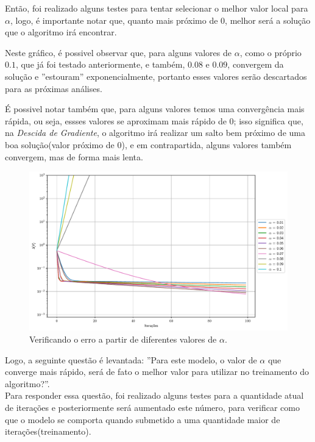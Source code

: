 \documentclass[a4paper, 12pt]{article}
\begin{document}
Então, foi realizado alguns testes para tentar selecionar o melhor valor local para $\alpha$, logo, é importante
notar que, quanto mais próximo de $0$, melhor será a solução que o algoritmo irá encontrar. 

Neste gráfico, é possivel observar que, para alguns valores de $\alpha$, como o próprio $0.1$, que já foi testado anteriormente, e também,
$0.08$ e $0.09$, convergem da solução e ''estouram'' exponencialmente, portanto esses valores serão descartados para as próximas análises.

É possivel notar também que, para alguns valores temos uma convergência mais rápida, ou seja, essses valores se aproximam mais rápido de $0$; isso significa que, na \textit{Descida de Gradiente}, o algoritmo irá realizar
um salto bem próximo de uma boa solução(valor próximo de $0$), e em contrapartida, alguns valores também convergem, mas de forma mais lenta.


\begin{figure}[!h]
    \centering
    \includegraphics[width=1\textwidth]{../imgs/overflow_insights.pdf}
    \caption{Verificando o erro a partir de diferentes valores de $\alpha$.}
    \label{fig:overflow_insights}
\end{figure}

Logo, a seguinte questão é levantada: ''Para este modelo, o valor de $\alpha$ que converge mais rápido,
será de fato o melhor valor para utilizar no treinamento do algoritmo?''.\\

Para responder essa questão, foi realizado alguns testes para a quantidade atual de iterações e posteriormente será aumentado este
número, para verificar como que o modelo se comporta quando submetido a uma quantidade maior de iterações(treinamento).
\clearpage
\end{document}
